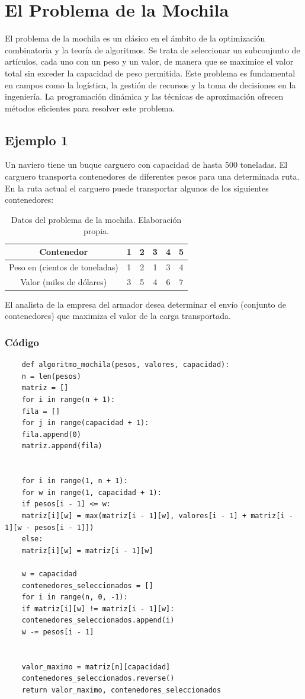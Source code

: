 \section{El Problema de la Mochila}
El problema de la mochila es un clásico en el ámbito de la optimización combinatoria y la teoría de algoritmos. Se trata de seleccionar un subconjunto de artículos, cada uno con un peso y un valor, de manera que se maximice el valor total sin exceder la capacidad de peso permitida. Este problema es fundamental en campos como la logística, la gestión de recursos y la toma de decisiones en la ingeniería. La programación dinámica y las técnicas de aproximación ofrecen métodos eficientes para resolver este problema.

\subsection{Ejemplo 1}
Un naviero tiene un buque carguero con capacidad de hasta 500 toneladas. El carguero transporta contenedores de diferentes pesos para una determinada ruta. En la ruta actual el carguero puede transportar algunos de los siguientes contenedores:


\begin{table}[H]
	\centering
	\begin{tabular}{cccccc}
		\toprule
		\textbf{Contenedor} & 1 & 2 & 3 & 4 & 5 \\
		\midrule
		Peso en (cientos de toneladas) & 1 & 2 & 1 & 3 & 4 \\
		Valor (miles de dólares) & 3 & 5 & 4 & 6 & 7 \\
		\bottomrule
	\end{tabular}
	\caption{Datos del problema de la mochila. Elaboración propia.}
	\label{tab:datos_contenedores}
\end{table}


El analista de la empresa del armador desea determinar el envío (conjunto de contenedores) que maximiza el valor de la carga transportada.

\subsubsection{Código}
\begin{lstlisting}
	def algoritmo_mochila(pesos, valores, capacidad):
	n = len(pesos)  
	matriz = []
	for i in range(n + 1):
	fila = []
	for j in range(capacidad + 1):
	fila.append(0)  
	matriz.append(fila)  
	
	
	for i in range(1, n + 1):  
	for w in range(1, capacidad + 1):  
	if pesos[i - 1] <= w:  
	matriz[i][w] = max(matriz[i - 1][w], valores[i - 1] + matriz[i - 1][w - pesos[i - 1]])  
	else:
	matriz[i][w] = matriz[i - 1][w]  
	
	w = capacidad  
	contenedores_seleccionados = []  
	for i in range(n, 0, -1):  
	if matriz[i][w] != matriz[i - 1][w]:  
	contenedores_seleccionados.append(i)
	w -= pesos[i - 1]
	
	
	valor_maximo = matriz[n][capacidad]
	contenedores_seleccionados.reverse()  
	return valor_maximo, contenedores_seleccionados
	
\end{lstlisting}

